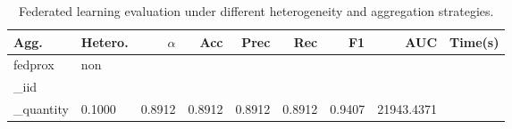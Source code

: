 \begin{table}[t]
\centering
\caption{Federated learning evaluation under different heterogeneity and aggregation strategies.}\n\label{tab:phase2_federated_results}\n\begin{tabular}{l l r r r r r r r}\n\hline
Agg. & Hetero. & $\alpha$ & Acc & Prec & Rec & F1 & AUC & Time(s) \\ \hline
fedprox & non\\_iid\\_quantity & 0.1000 & 0.8912 & 0.8912 & 0.8912 & 0.8912 & 0.9407 & 21943.4371 \\ 
\hline
\end{tabular}
\end{table}
